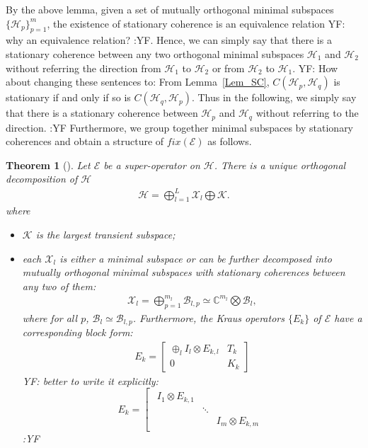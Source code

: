 \documentclass[journal]{IEEEtran}
\def\h{\ensuremath{\mathcal{H}}}
\def\k{\ensuremath{\mathcal{K}}}
\def\x{\ensuremath{\mathcal{X}}}
\def\b{\ensuremath{\mathcal{B}}}
\def\e{\ensuremath{\mathcal{E}}}
\def\k{\mathcal{K}}
\newtheorem{theorem}{Theorem}
\newcommand{\authorComment}[3]{\color{#1}#2: {#3} :#2\color{black}}
\newcommand{\yf}[1]{\authorComment{blue}{YF}{#1}}
\begin{document}
By the above lemma, given a set of mutually orthogonal minimal subspaces $\{\h_p\}_{p=1}^{m}$, the existence of stationary coherence is an equivalence relation \yf{why an equivalence relation?}. Hence, we can simply say that  there is a stationary coherence between any two orthogonal minimal subspaces $\h_1$ and $\h_2$ without referring the direction from $\h_1$ to $\h_2$ or from $\h_2$ to $\h_1$. 
\yf{How about changing these sentences to: From Lemma~\ref{Lem_SC}, $C(\h_p,\h_q)$ is stationary if and only if so is $C(\h_q,\h_p)$. Thus in the following, we simply say that there is a stationary coherence between $\h_p$ and $\h_q$ without referring to the direction.}
Furthermore,  we group together minimal subspaces by stationary coherences and obtain a structure of $fix(\e)$ as follows. 
\begin{theorem}[\cite{baumgartner2012structure}]\label{Theo_NS_Dec}
  Let $\e$ be a super-operator on $\h$. There is a unique  orthogonal decomposition of $\h$
  \begin{eqnarray}\label{Eq_NS_dec_unique}
    \h=\bigoplus_{l=1}^{L}\x_l\bigoplus \k.
  \end{eqnarray}
  where \begin{itemize}
    \item[(1)] $\k$ is the largest transient subspace;
    \item[(2)] each $\x_l$ is either a minimal subspace or can be further decomposed into mutually orthogonal minimal subspaces with stationary coherences between any two of them:
    \begin{eqnarray}\label{Eq_NS_dec}
      \x_l=\bigoplus_{p=1}^{m_l}\b_{l,p}\simeq\mathbb{C}^{m_l}\bigotimes \b_l, 
    \end{eqnarray} 
   where for all $p$, $\b_l\simeq \b_{l,p}$. Furthermore, the Kraus operators $\{E_k\}$ of $\e$ have a corresponding block form:
  \begin{eqnarray}\label{Eq_SC_dec_Kraus}
    E_k=\left[\begin{matrix}
  \oplus_l I_{l}\otimes E_{k,l} & T_k\\
0&K_k
\end{matrix}\right]
  \end{eqnarray}
  \yf{better to write it explicitly:
$$\renewcommand{\arraystretch}{1.2}
E_k=\left[\begin{array}{c|c}
  \begin{array}{ccc}
  I_{1}\otimes E_{k,1} &  &\\
   & \ddots &\\
   & & I_{m}\otimes E_{k,m}  

\end{array}
\end{array}$$}
\end{itemize}
\end{theorem}
\end{document}
